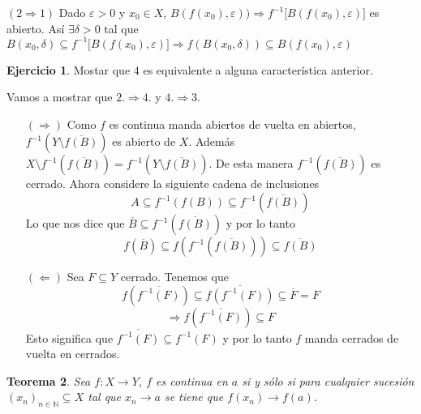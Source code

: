 \documentclass[12pt]{article}
\theoremstyle{plain}
\newtheorem{Th}{Teorema}[subsection]   %
\theoremstyle{definition}
\newtheorem{Ej}[Th]{Ejercicio}
\theoremstyle{remark}
\numberwithin{equation}{section}
\newcommand{\bN}{\mathbb{N}}        %
\renewcommand{\:}{\colon}           %
\begin{document}
\begin{multicols}{2}
\begin{ptcbp}
$(\mathit{2}\Rightarrow\mathit{1})$ Dado $\varepsilon>0$ y $x_0\in X$, $B(f(x_0),\varepsilon))\Rightarrow f^{-1}\lbrack B(f(x_0),\varepsilon)\rbrack$ es abierto. Así $\exists\delta>0$ tal que $B(x_0,\delta)\subseteq f^{-1}\lbrack B(f(x_0),\varepsilon)\rbrack\Rightarrow f(B(x_0,\delta))\subseteq B(f(x_0),\varepsilon)$

\end{ptcbp}

\begin{Ej}
  Mostar que $\mathit{4}$ es equivalente a alguna característica anterior.
\end{Ej}
\begin{ptcb}
Vamos a mostrar que $\mathit{2}.\Rightarrow\mathit{4}.$ y $\mathit{4}.\Rightarrow\mathit{3}.$
\begin{enumerate}
  \item[$(\Rightarrow)$] Como $f$ es continua manda abiertos de vuelta en abiertos,  $f^{-1}(Y\setminus \overline{f(B)})$ es abierto de $X$. Además $X\setminus f^{-1}(\overline{f(B)})=f^{-1}(Y\setminus \overline{f(B)})$. De esta manera $f^{-1}(\overline{f(B)})$ es cerrado. Ahora considere la siguiente cadena de inclusiones
      $$A\subseteq f^{-1}(f(B))\subseteq f^{-1}(\overline{f(B)})$$
      Lo que nos dice que $\overline{B}\subseteq f^{-1}(\overline{f(B)})$ y por lo tanto
      $$f(\overline{B})\subseteq f(f^{-1}(\overline{f(B)}))\subseteq\overline{f(B)} $$
  \item[$(\Leftarrow)$] Sea $F\subseteq Y$ cerrado. Tenemos que
  $$f(\overline{f^{-1}(F)}) \subseteq \overline{f(f^{-1}(F))} \subseteq \overline{F} = F$$
  $$\Rightarrow f(\overline{f^{-1}(F)}) \subseteq F$$
  Esto significa que $\overline{f^{-1}(F)}\subseteq f^{-1}(F)$ y por lo tanto $f$ manda cerrados de vuelta en cerrados.
\end{enumerate}
\end{ptcb}
\begin{Th}
  Sea $f\colon X\to Y$, $f$ es continua en $a$ si y sólo si para cualquier sucesión $(x_n)_{n\in\bN}\subseteq X$ tal que $x_n\to a$ se tiene que $f(x_n)\to f(a)$.
\end{Th}


\end{multicols}
\end{document}

